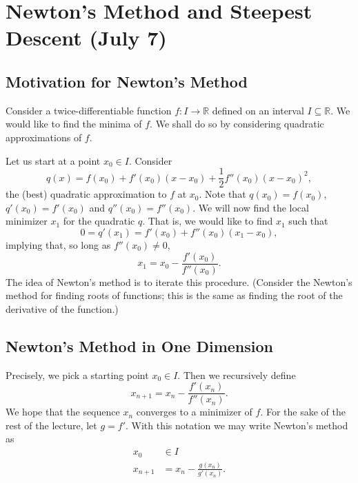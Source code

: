 \documentclass[11pt]{book}
\newcommand{\R}{\mathbb{R}}
\begin{document}
\section{Newton's Method and Steepest Descent (July 7)}

\subsection{Motivation for Newton's Method}

Consider a twice-differentiable function $f : I \to \R$ defined on an interval $I \subseteq \R$. We would like to find the minima of $f$. We shall do so by considering quadratic approximations of $f$. 

Let us start at a point $x_0 \in I$. Consider 
\[
q(x) = f(x_0) + f'(x_0)(x - x_0) + \frac{1}{2}f''(x_0)(x-x_0)^2,
\]
the (best) quadratic approximation to $f$ at $x_0$. Note that $q(x_0) = f(x_0)$, $q'(x_0) = f'(x_0)$ and $q''(x_0) = f''(x_0)$. We will now find the local minimizer $x_1$ for the quadratic $q$. That is, we would like to find $x_1$ such that
\[
0 = q'(x_1) = f'(x_0) + f''(x_0)(x_1-x_0),
\]
implying that, so long as $f''(x_0) \neq 0$, 
\[
x_1 = x_0 - \frac{f'(x_0)}{f''(x_0)}.
\]
The idea of Newton's method is to iterate this procedure. (Consider the Newton's method for finding roots of functions; this is the same as finding the root of the derivative of the function.)

\subsection{Newton's Method in One Dimension}

Precisely, we pick a starting point $x_0 \in I$. Then we recursively define
\[
x_{n+1} = x_n - \frac{f'(x_n)}{f''(x_n)}.
\]
We hope that the sequence $x_n$ converges to a minimizer of $f$. For the sake of the rest of the lecture, let $g = f'$. With this notation we may write Newton's method as
\begin{align*}
x_0 &\in I \\
x_{n+1} &= x_n - \frac{g(x_n)}{g'(x_n)}.
\end{align*}
\end{document}
